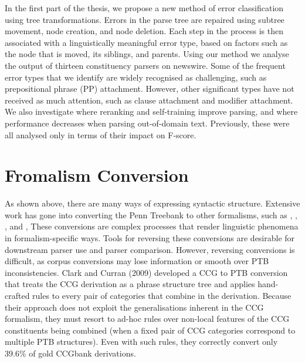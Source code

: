 In the first part of the thesis, we propose a new method of error classification using tree transformations.
Errors in the parse tree are repaired using subtree movement, node creation, and node deletion.
Each step in the process is then associated with a linguistically meaningful error type, based on factors such as the node that is moved, its siblings, and parents.  
Using our method we analyse the output of thirteen constituency parsers on newswire.
Some of the frequent error types that we identify are widely recognised as challenging, such as prepositional phrase (PP) attachment.
However, other significant types have not received as much attention, such as clause attachment and modifier attachment.
We also investigate where reranking and self-training improve parsing, and where performance decreases when parsing out-of-domain text.
Previously, these were all analysed only in terms of their impact on F-score.

\section{Fromalism Conversion}

As shown above, there are many ways of expressing syntactic structure.
Extensive work has gone into converting the Penn Treebank \parencite[\ptb][]{Marcus-Marcinkiewicz-Santorini:1993} to other formalisms, such as \hpsg \parencite{Miyao-Ninomiya-Tsujii:2004}, \lfg \parencite{Cahill-etal:2008}, \ltag \parencite{Xia:1999}, and \ccg \parencite{CCGBank},
These conversions are complex processes that render linguistic phenomena in formalism-specific ways.
Tools for reversing these conversions are desirable for downstream parser use and parser comparison.
However, reversing conversions is difficult, as corpus conversions may lose information or smooth over PTB inconsistencies.
Clark and Curran (2009) developed a CCG to PTB conversion that treats the CCG derivation as a phrase structure tree and applies hand-crafted rules to every pair of categories that combine in the derivation.
Because their approach does not exploit the generalisations inherent in the CCG formalism, they must resort to ad-hoc rules over non-local features of the CCG constituents being combined (when a fixed pair of CCG categories correspond to multiple PTB structures).
Even with such rules, they correctly convert only 39.6\% of gold CCGbank derivations.

